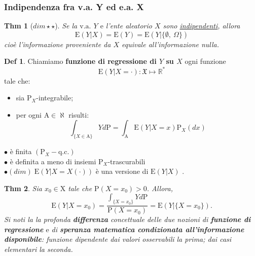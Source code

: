 \documentclass[a4paper,11pt]{article}
\theoremstyle{plain}
\newtheorem{thm}{Thm}[section]
\theoremstyle{definition}
\newtheorem{defn}{Def}[section]
\theoremstyle{remark}
\begin{document}
\subsubsection{Indipendenza fra v.a. Y ed e.a. X}
\begin{thm}[$dim \star \star $]
Se la $\mathrm{v}.\mathrm{a}.$ $ Y$ $ \mathrm{e}$ l'ente aleatorio $X$ sono \underline{indipendenti}, allora
$$
\mathrm{E}(Y|X)=\mathrm{E}(Y)=\mathrm{E}(Y|\{\emptyset,\ \Omega\})
$$
cioè l'informazione proveniente da $X$ equivale all'informazione nulla.
\end{thm}


\begin{defn}
Chiamiamo \textbf{funzione di regressione di $Y$ su $X$} ogni funzione
$$
\mathrm{E}(Y|X=\cdot):\mathfrak{X}\mapsto \mathbb{R}^{*}
$$
tale $\mathrm{c}\mathrm{h}\mathrm{e}$:
\begin{itemize}
\item [1.] sia $\mathrm{P}_{X}$-integrabile;
\item [2.] per ogni $\mathrm{A}\in\aleph$ risulti:
$$
\int_{\{X\in \mathrm{A}\}}Yd\mathrm{P}=\int_{\mathrm{A}}\mathrm{E}(Y|X=x)\mathrm{P}_{X}(dx)
$$
\end{itemize}
\end{defn}


$\bullet$ \`{e} finita $(\mathrm{P}_{X}-\mathrm{q}.\mathrm{c}.)$\\

$\bullet$ \`{e} definita a meno di insiemi $\mathrm{P}_{X}$-trascurabili\\

$\bullet (dim) \; \mathrm{E}(Y|X=X(\cdot))$ \`{e} una versione di $\mathrm{E}(Y|X)$ .

\begin{thm}
Sia $x_{0}\in \mathrm{X}$ tale che $\mathrm{P}(X=x_{0})>0$. Allora,
$$ 
\mathrm{E}(Y|X=x_{0})=\frac{\displaystyle \int_{\{X=x_{0}\}}Yd\mathrm{P}}{\mathrm{P}(X=x_{0})}=\mathrm{E}(Y|\{X=x_{0}\}).
$$
Si noti la la profonda \textbf{differenza} concettuale delle due nozioni di \textbf{funzione di regressione} $\mathrm{e}$ di \textbf{speranza matematica condizionata all'informazione disponibile}: funzione dipendente dai {\it valori osservabili} la prima; dai {\it casi elementari} la seconda.
\end{thm}
\end{document}
